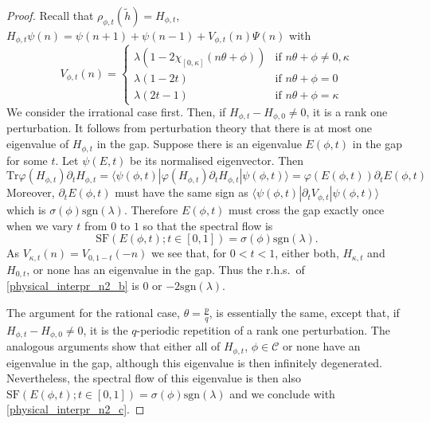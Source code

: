 \documentclass[11pt]{amsart}
\newcommand{\cut}{\kappa}
\newcommand{\p}{p}
\newcommand{\q}{q}
\begin{document}
\begin{proof}
Recall that 
$\rho_{\phi,t}(\tilde h)= H_{\phi,t}$, 
$H_{\phi,t}\psi(n) = \psi(n+1)+\psi(n-1) + V_{\phi,t}(n)\Psi(n)$ with 
$$V_{\phi, t}(n) = \left\{\begin{array}{ll}
\lambda(1-2\chi_{[0, \cut]}(n\theta+\phi)) & \mbox{if } n\theta+\phi \neq 0,\cut \\
\lambda(1-2t) & \mbox{if } n\theta+\phi = 0 \\
\lambda(2t-1) & \mbox{if } n\theta+\phi =\cut
\end{array}
\right.$$
We consider the irrational case first. Then, if
$H_{\phi,t} - H_{\phi,0}\neq 0$, it is a rank one perturbation. It follows from perturbation theory that there is at most one eigenvalue of $H_{\phi,t}$ in the gap. Suppose there is an eigenvalue $E(\phi,t)$ in the gap for some $t$. Let $\psi(E,t)$ be its normalised eigenvector. Then 
$${\mathrm{Tr}}
	\varphi(H_{\phi,t})\partial_tH_{\phi,t} = \langle \psi(\phi,t)|\varphi(H_{\phi,t})\partial_t H_{\phi,t}|\psi(\phi,t) \rangle = \varphi(E(\phi,t))\partial_t E(\phi,t)$$
Moreover, $\partial_t E(\phi,t)$ must have the same sign as $\langle \psi(\phi,t)|\partial_t V_{\phi,t}|\psi(\phi,t) \rangle$ which is $\sigma(\phi)\mathrm{sgn}(\lambda)$. Therefore $E(\phi,t)$ must cross the gap exactly once when we vary $t$ from $0$ to $1$ so that the spectral flow is
$$\mathrm{SF}(E(\phi,t);t\in [0,1]) = \sigma(\phi)\mathrm{sgn}(\lambda).$$ 
As $V_{\cut,t}(n) = V_{0,1-t}(-n)$ we see that, for $0<t<1$, 
either both, $H_{\cut,t}$ and $H_{0,t}$, or none has an eigenvalue in the gap. Thus the r.h.s.\ of \eqref{physical_interpr_n2_b} is $0$ or $-2\mathrm{sgn}(\lambda)$.
 
The argument for the rational case, $\theta=\frac\p\q$, is essentially the same, except that,
 if
$H_{\phi,t} - H_{\phi,0}\neq 0$, it is the $\q$-periodic repetition of a rank one perturbation. The analogous arguments show that either all of 
$H_{\phi,t}$, $\phi\in \mathcal C$ or none have an eigenvalue in the gap, although this eigenvalue is then infinitely degenerated. Nevertheless, the spectral flow of this eigenvalue is then also $\mathrm{SF}(E(\phi,t);t\in [0,1]) = \sigma(\phi)\mathrm{sgn}(\lambda)$ and we conclude with \eqref{physical_interpr_n2_c}.
\end{proof}

\end{document}
